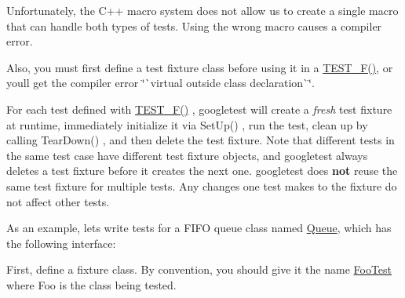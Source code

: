 Unfortunately, the C++ macro system does not allow us to create a single macro that can handle both types of tests. Using the wrong macro causes a compiler error.

Also, you must first define a test fixture class before using it in a {\ttfamily \mbox{\hyperlink{gtest_8h_a0ee66d464d1a06c20c1929cae09d8758}{T\+E\+S\+T\+\_\+\+F()}}}, or you\textquotesingle{}ll get the compiler error \char`\"{}\`{}virtual outside class
declaration\`{}\char`\"{}.

For each test defined with {\ttfamily \mbox{\hyperlink{gtest_8h_a0ee66d464d1a06c20c1929cae09d8758}{T\+E\+S\+T\+\_\+\+F()}}} , googletest will create a {\itshape fresh} test fixture at runtime, immediately initialize it via {\ttfamily Set\+Up()} , run the test, clean up by calling {\ttfamily Tear\+Down()} , and then delete the test fixture. Note that different tests in the same test case have different test fixture objects, and googletest always deletes a test fixture before it creates the next one. googletest does {\bfseries{not}} reuse the same test fixture for multiple tests. Any changes one test makes to the fixture do not affect other tests.

As an example, let\textquotesingle{}s write tests for a F\+I\+FO queue class named {\ttfamily \mbox{\hyperlink{classQueue}{Queue}}}, which has the following interface\+:


\begin{DoxyCode}{0}
\DoxyCodeLine{\};}
\end{DoxyCode}


First, define a fixture class. By convention, you should give it the name {\ttfamily \mbox{\hyperlink{classFooTest}{Foo\+Test}}} where {\ttfamily Foo} is the class being tested.


\begin{DoxyCode}{0}
\DoxyCodeLine{  \}}
\DoxyCodeLine{}
\DoxyCodeLine{}
\DoxyCodeLine{\};}
\end{DoxyCode}


